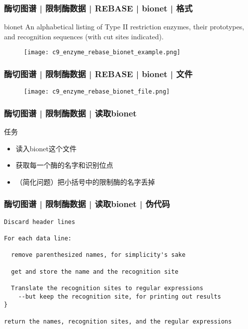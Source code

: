 \begin{frame}
  \frametitle{酶切图谱 | 限制酶数据 | REBASE | bionet | 格式}
  \begin{block}{bionet}
    An alphabetical listing of Type II restriction enzymes, their prototypes, and recognition sequences (with cut sites indicated). 
  \end{block}
  \begin{figure}
    \centering
    \texttt{[image: c9\_enzyme\_rebase\_bionet\_example.png]}
  \end{figure}
\end{frame}

\begin{frame}
  \frametitle{酶切图谱 | 限制酶数据 | REBASE | bionet | 文件}
  \begin{figure}
    \centering
    \texttt{[image: c9\_enzyme\_rebase\_bionet\_file.png]}
  \end{figure}
\end{frame}

\begin{frame}
  \frametitle{酶切图谱 | 限制酶数据 | 读取bionet}
  \begin{block}{任务}
    \begin{itemize}
      \item 读入bionet这个文件
      \item 获取每一个酶的名字和识别位点
      \item （简化问题）把小括号中的限制酶的名字丢掉
    \end{itemize}
  \end{block}
\end{frame}

\begin{frame}[fragile]
  \frametitle{酶切图谱 | 限制酶数据 | 读取bionet | 伪代码}
  \vspace{-1.5em}
\begin{lstlisting}[basicstyle=\small\tt]
Discard header lines 

For each data line:

  remove parenthesized names, for simplicity's sake

  get and store the name and the recognition site

  Translate the recognition sites to regular expressions
    --but keep the recognition site, for printing out results
}

return the names, recognition sites, and the regular expressions
\end{lstlisting}
\end{frame}

